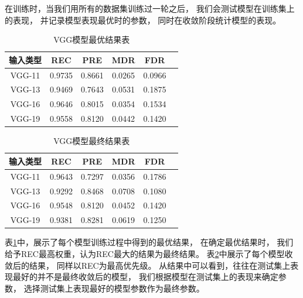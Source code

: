 在训练时，当我们用所有的数据集训练过一轮之后，
我们会测试模型在训练集上的表现，
并记录模型表现最优时的参数，
同时在收敛阶段统计模型的表现。
\begin{table}
\centering
\begin{tabular}{cccccp{38mm}}
\toprule
\textbf{输入类型} & \textbf{REC} & \textbf{PRE} & \textbf{MDR} & \textbf{FDR}\\
\midrule
\mbox{VGG-11} & 0.9735 & 0.8661 & 0.0265 & 0.0966\\
\mbox{VGG-13} & 0.9469 & 0.7643 & 0.0531 & 0.1875\\
\mbox{VGG-16} & 0.9646 & 0.8015 & 0.0354 & 0.1534\\
\mbox{VGG-19} & 0.9558 & 0.8120 & 0.0442 & 0.1420\\
\bottomrule
\end{tabular}
\caption{VGG模型最优结果表}
\label{tab:zuiyoujieguo}
\end{table}
\begin{table}
\centering
\begin{tabular}{cccccp{38mm}}
\toprule
\textbf{输入类型} & \textbf{REC} & \textbf{PRE} & \textbf{MDR} & \textbf{FDR}\\
\midrule
\mbox{VGG-11} & 0.9643 & 0.7297 & 0.0356 & 0.1786\\
\mbox{VGG-13} & 0.9292 & 0.8468 & 0.0708 & 0.1080\\
\mbox{VGG-16} & 0.9548 & 0.8120 & 0.0452 & 0.1420\\
\mbox{VGG-19} & 0.9381 & 0.8281 & 0.0619 & 0.1250\\
\bottomrule
\end{tabular}
\caption{VGG模型最终结果表}
\label{tab:zuizhongjieguo}
\end{table}
表\ref{tab:zuiyoujieguo}中，展示了每个模型训练过程中得到的最优结果，
在确定最优结果时，
我们给予REC最高权重，认为REC最大的结果为最终结果。
表\ref{tab:zuizhongjieguo}中展示了每个模型收敛后的结果，
同样以REC为最高优先级。
从结果中可以看到，往往在测试集上表现最好的并不是最终收敛后的模型，
我们根据模型在测试集上的表现来确定参数，
选择测试集上表现最好的模型参数作为最终参数。


